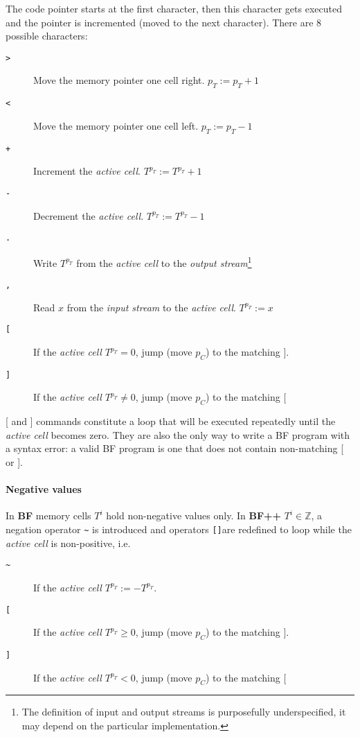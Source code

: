 The code pointer starts at the first character, then this character gets executed and the pointer is incremented (moved to the next character).
There are 8 possible characters:

\begin{description}
\item[\texttt{>}] Move the memory pointer one cell right. $p_T := p_T + 1$
\item[\texttt{<}] Move the memory pointer one cell left. $p_T := p_T - 1$
\item[\texttt{+}] Increment the \textit{active cell}. $T^{p_T} := T^{p_T} + 1$
\item[\texttt{-}] Decrement the \textit{active cell}. $T^{p_T} := T^{p_T} - 1$
\item[\texttt{.}] Write $T^{p_T}$ from the \textit{active cell} to the \textit{output stream}\footnote{The definition of input and output streams is purposefully underspecified, it may depend on the particular implementation.}
\item[\texttt{,}] Read $x$ from the \textit{input stream} to the \textit{active cell}. $T^{p_T} := x$
\item[ \texttt{[} ] If the \textit{active cell} $T^{p_T} = 0$, jump (move $p_C$) to the matching $]$.
\item[ \texttt{]} ] If the \textit{active cell} $T^{p_T} \neq 0$, jump (move $p_C$) to the matching $[$
\end{description}

[ and ] commands constitute a loop that will be executed repeatedly until the \textit{active cell} becomes zero.
They are also the only way to write a BF program with a syntax error: a valid BF program is one that does not contain non-matching [ or ].


\paragraph{Negative values}

In \textbf{BF} memory cells $T^i$ hold non-negative values only.
In \textbf{BF++} $T^i \in \mathbb{Z}$, a negation operator \texttt{\~} is introduced and operators \texttt{[]}are redefined to loop while the \textit{active cell} is non-positive, i.e.

\begin{description}
\item[ \texttt{\~} ] If the \textit{active cell} $T^{p_T} := - T^{p_T}$.
\item[ \texttt{[} ] If the \textit{active cell} $T^{p_T} \geq 0$, jump (move $p_C$) to the matching $]$.
\item[ \texttt{]} ] If the \textit{active cell} $T^{p_T} < 0$, jump (move $p_C$) to the matching $[$
\end{description}

